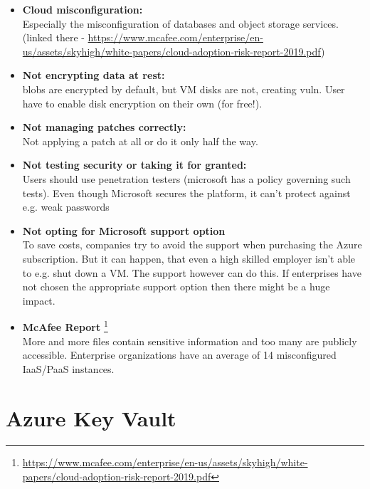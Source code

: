 \documentclass[12pt]{article}
\begin{document}
\begin{itemize}
    
    \item \textbf{Cloud misconfiguration:} \footnotemark[3] \\
    Especially the misconfiguration of databases and object storage services. (linked there - \url{https://www.mcafee.com/enterprise/en-us/assets/skyhigh/white-papers/cloud-adoption-risk-report-2019.pdf})
    
    \item \textbf{Not encrypting data at rest:} \footnotemark[3] \\ 
    blobs are encrypted by default, but VM disks are not, creating vuln. User have to enable disk encryption on their own (for free!).
    
    \item \textbf{Not managing patches correctly:} \footnotemark[4] \\
    Not applying a patch at all or do it only half the way.
    
    \item \textbf{Not testing security or taking it for granted:} \footnotemark[4] \footnotemark[1] \\ 
    Users should use penetration testers (microsoft has a policy governing such tests).
    Even though Microsoft secures the platform, it can't protect against e.g. weak passwords
    
    \item \textbf{Not opting for Microsoft support option} \footnotemark[1] \\
    To save costs, companies try to avoid the support when purchasing the Azure subscription. 
    But it can happen, that even a high skilled employer isn't able to e.g. shut down a VM. The support however can do this. If enterprises have not chosen the appropriate support option then there might be a huge impact. 
    
    \item \textbf{McAfee Report} \footnote{\url{https://www.mcafee.com/enterprise/en-us/assets/skyhigh/white-papers/cloud-adoption-risk-report-2019.pdf}} \\
    More and more files contain sensitive information and too many are publicly accessible. Enterprise organizations have an average of 14 misconfigured IaaS/PaaS instances.
    
\end{itemize}


\newpage
\section*{Azure Key Vault}
\end{document}

